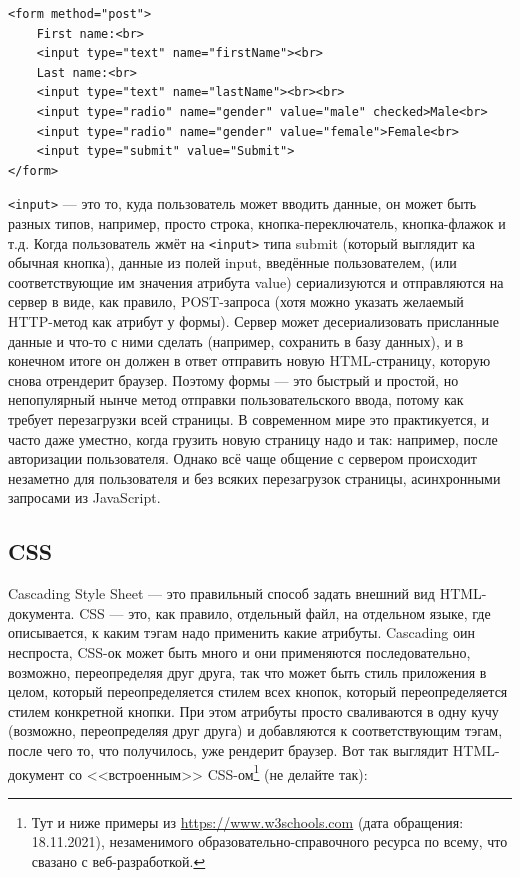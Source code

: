 \documentclass[a5paper]{article}
\begin{document}
\begin{verbatim}
<form method="post">
    First name:<br>
    <input type="text" name="firstName"><br>
    Last name:<br>
    <input type="text" name="lastName"><br><br>
    <input type="radio" name="gender" value="male" checked>Male<br>
    <input type="radio" name="gender" value="female">Female<br>
    <input type="submit" value="Submit">
</form>
\end{verbatim}

\texttt{<input>} --- это то, куда пользователь может вводить данные, он может быть разных типов, например, просто строка, кнопка-переключатель, кнопка-флажок и т.д. Когда пользователь жмёт на \texttt{<input>} типа submit (который выглядит ка обычная кнопка), данные из полей input, введённые пользователем, (или соответствующие им значения атрибута value) сериализуются и отправляются на сервер в виде, как правило, POST-запроса (хотя можно указать желаемый HTTP-метод как атрибут у формы). Сервер может десериализовать присланные данные и что-то с ними сделать (например, сохранить в базу данных), и в конечном итоге он должен в ответ отправить новую HTML-страницу, которую снова отрендерит браузер. Поэтому формы --- это быстрый и простой, но непопулярный нынче метод отправки пользовательского ввода, потому как требует перезагрузки всей страницы. В современном мире это практикуется, и часто даже уместно, когда грузить новую страницу надо и так: например, после авторизации пользователя. Однако всё чаще общение с сервером происходит незаметно для пользователя и без всяких перезагрузок страницы, асинхронными запросами из JavaScript.

\subsection{CSS}

Cascading Style Sheet --- это правильный способ задать внешний вид HTML-документа. CSS --- это, как правило, отдельный файл, на отдельном языке, где описывается, к каким тэгам надо применить какие атрибуты. Cascading оин неспроста, CSS-ок может быть много и они применяются последовательно, возможно, переопределяя друг друга, так что может быть стиль приложения в целом, который переопределяется стилем всех кнопок, который переопределяется стилем конкретной кнопки. При этом атрибуты просто сваливаются в одну кучу (возможно, переопределяя друг друга) и добавляются к соответствующим тэгам, после чего то, что получилось, уже рендерит браузер. Вот так выглядит HTML-документ со <<встроенным>> CSS-ом\footnote{Тут и ниже примеры из \url{https://www.w3schools.com} (дата обращения: 18.11.2021), незаменимого образовательно-справочного ресурса по всему, что свазано с веб-разработкой.} (не делайте так):
\end{document}
